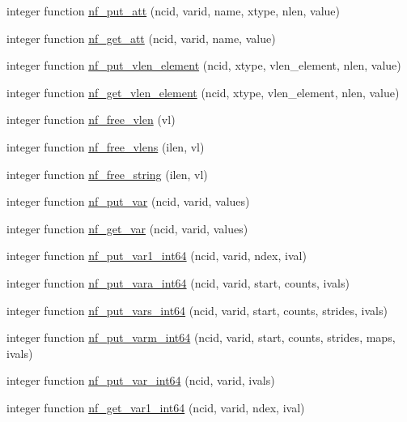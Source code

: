 \begin{DoxyCompactItemize}
\item 
integer function \hyperlink{nf__nc4_8f90_a732094664cbfe02baccb9f29bfd4aade}{nf\+\_\+put\+\_\+att} (ncid, varid, name, xtype, nlen, value)
\item 
integer function \hyperlink{nf__nc4_8f90_a9851e7bfb068f31dacee9bd9dd272f53}{nf\+\_\+get\+\_\+att} (ncid, varid, name, value)
\item 
integer function \hyperlink{nf__nc4_8f90_a5bc75056dc718cbfbc9232ec8bc4baf1}{nf\+\_\+put\+\_\+vlen\+\_\+element} (ncid, xtype, vlen\+\_\+element, nlen, value)
\item 
integer function \hyperlink{nf__nc4_8f90_afe58043bc27d91319d611319c7fcbccf}{nf\+\_\+get\+\_\+vlen\+\_\+element} (ncid, xtype, vlen\+\_\+element, nlen, value)
\item 
integer function \hyperlink{nf__nc4_8f90_a783c560e5fe8b1b284b9c54b0cdba166}{nf\+\_\+free\+\_\+vlen} (vl)
\item 
integer function \hyperlink{nf__nc4_8f90_abc2eeab21ddb85136f717244aaa2f968}{nf\+\_\+free\+\_\+vlens} (ilen, vl)
\item 
integer function \hyperlink{nf__nc4_8f90_a361be5beca04898ff8116a83228a123d}{nf\+\_\+free\+\_\+string} (ilen, vl)
\item 
integer function \hyperlink{nf__nc4_8f90_a653feada4a0204bc113861fc56500b9f}{nf\+\_\+put\+\_\+var} (ncid, varid, values)
\item 
integer function \hyperlink{nf__nc4_8f90_aa4198aa931954a0d561f7e446e221213}{nf\+\_\+get\+\_\+var} (ncid, varid, values)
\item 
integer function \hyperlink{nf__nc4_8f90_aed029319864a09946611fdf6c72279fe}{nf\+\_\+put\+\_\+var1\+\_\+int64} (ncid, varid, ndex, ival)
\item 
integer function \hyperlink{nf__nc4_8f90_aaa2e15a12ff25e718fa2c8a01cc86ae9}{nf\+\_\+put\+\_\+vara\+\_\+int64} (ncid, varid, start, counts, ivals)
\item 
integer function \hyperlink{nf__nc4_8f90_a3753d47abff6fc4d5b56ceed62997265}{nf\+\_\+put\+\_\+vars\+\_\+int64} (ncid, varid, start, counts, strides, ivals)
\item 
integer function \hyperlink{nf__nc4_8f90_a2a0451379c49b344c4cd83c97095d2b2}{nf\+\_\+put\+\_\+varm\+\_\+int64} (ncid, varid, start, counts, strides, maps, ivals)
\item 
integer function \hyperlink{nf__nc4_8f90_a976a8dc400d70b3494181f5b6c44befe}{nf\+\_\+put\+\_\+var\+\_\+int64} (ncid, varid, ivals)
\item 
integer function \hyperlink{nf__nc4_8f90_a208479237be0144193d0b1cd32062b8d}{nf\+\_\+get\+\_\+var1\+\_\+int64} (ncid, varid, ndex, ival)

\end{DoxyCompactItemize}
